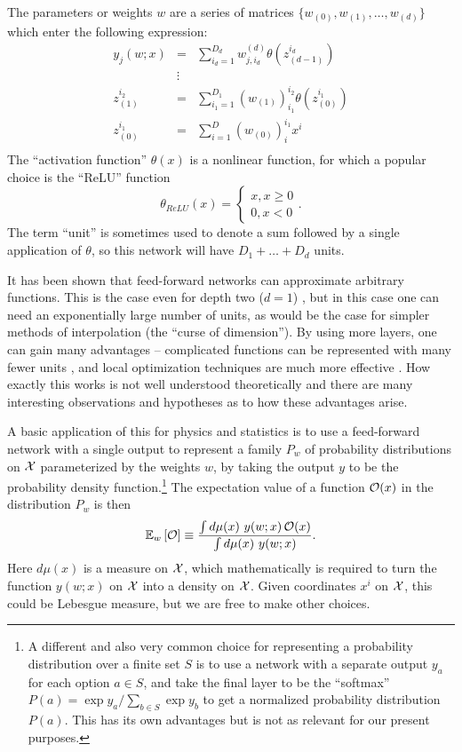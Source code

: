 \documentclass[12pt]{article}
\def\E#1#2{\mathbb{E}_{#1}\left[#2\right]}
\def\CO {{\cal O}}
\def\CX {{\cal X}}
\newcommand{\be}{\begin{equation}}
\newcommand{\ee}{\end{equation}}
\newcommand{\bea}{\begin{eqnarray}}
\newcommand{\eea}{\end{eqnarray}}
\begin{document}
The parameters or weights $w$ are a series of matrices $\{ w_{(0)},w_{(1)},\ldots,w_{(d)} \}$ which enter the 
following expression:
\bea \label{eq:defFy}
y_j(w;x) &=& \sum_{i_d=1}^{D_d} w^{(d)}_{j,i_d} \theta( z_{(d-1)}^{i_d} )\\
 &\vdots & \nonumber \\ \label{eq:defF2}
  z_{(1)}^{i_2} &=& \sum_{i_1=1}^{D_1} (w_{(1)})^{i_2}_{i_1} \theta( z_{(0)}^{i_1} )\\
  \label{eq:defF1}
 z_{(0)}^{i_1} &=& \sum_{i=1}^D (w_{(0)})^{i_1}_i x^i \\
\eea
The ``activation function'' $\theta(x)$ is a nonlinear function, for which a popular choice is
the ``ReLU'' function 
\be
\theta_{ReLU}(x) = \begin{cases} x, x\ge 0 \\ 0, x<0 \end{cases}.
\ee
The term ``unit'' is sometimes used to denote a sum followed by a single application of $\theta$,
so this network will have $D_1+\ldots+D_d$ units.

It has been shown that feed-forward networks can approximate arbitrary functions.
This is the case even for depth two ($d=1$) \cite{Cybenko}, but in this case one can need an exponentially
large number of units, as would be the case for simpler methods of interpolation (the ``curse of dimension'').
By using more layers, one can gain many advantages -- complicated functions can be represented with
many fewer units \cite{}, and local optimization techniques are much more effective \cite{}.  
How exactly this works is not
well understood theoretically and there are many interesting observations and hypotheses as to how these
advantages arise.

A basic application of this for physics and statistics is to use a feed-forward network with a single
output to represent a family $P_w$ of probability distributions on $\CX$ parameterized by the weights $w$,
by taking the output $y$ to be the probability density function.\footnote{
A different and also very common choice for representing a probability distribution over a finite set
$S$ is to use a network with a separate output $y_a$ for each option $a\in S$, and take the final layer
to be the ``softmax'' $P(a)=\exp y_a/\sum_{b\in S} \exp y_b$ to get a normalized probability distribution $P(a)$.
This has its own advantages but is not as relevant for our present purposes.}
The expectation value of a function $\CO(x)$ in the distribution $P_w$ is then
\be
\E{w}{\CO} \equiv \frac{ \int d\mu(x)\ y(w;x)\, \CO(x) }{ \int d\mu(x)\ y(w;x) } .
\ee
Here $d\mu(x)$ is a measure on $\CX$, which mathematically is required to turn the function $y(w;x)$ on $\CX$
into a density on $\CX$.  Given coordinates $x^i$ on $\CX$, this could be Lebesgue measure, but we are free
to make other choices.
\end{document}

